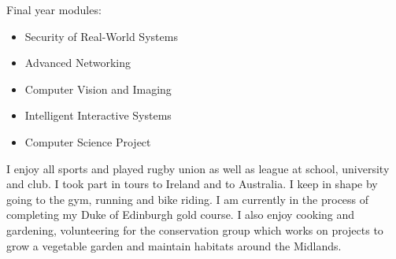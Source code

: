 \documentclass[12pt]{CVformat}
\begin{document}
    \SmallSep

    
    Final year modules:
    \begin{itemize}
        \item Security of Real-World Systems
        \item Advanced Networking
        \item Computer Vision and Imaging
        \item Intelligent Interactive Systems
        \item Computer Science Project
    \end{itemize}
    

    I enjoy all sports and played rugby union as well as league at school, university and club. I took part in tours to Ireland and to Australia. I keep in shape by going to the gym, running and bike riding. I am currently in the process of completing my Duke of Edinburgh gold course. I also enjoy cooking and gardening, volunteering for the conservation group which works on projects to grow a vegetable garden and maintain habitats around the Midlands. 
\end{document}
